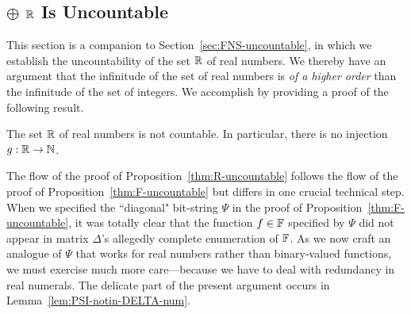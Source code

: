 \subsection{$\oplus$ $\mathbb{R}$ Is Uncountable}
\label{sec:R-uncountable}
\label{sec:Reals-uncountable}


This section is a companion to Section~\ref{sec:FNS-uncountable}, in which we establish the uncountability of the set $\mathbb{R}$ of real numbers.  We thereby have an argument that the infinitude of the set of real numbers is {\em of a higher order} than the infinitude of the set of integers.  We accomplish by providing a proof of the following result.

\begin{prop}
\label{thm:R-uncountable}
The set $\mathbb{R}$ of real numbers is not countable.  In particular, there is no injection $g: \mathbb{R} \rightarrow \mathbb{N}$.
\end{prop}

\smallskip

The flow of the proof of Proposition~\ref{thm:R-uncountable} follows the flow of the proof of Proposition~\ref{thm:F-uncountable} but differs in one crucial technical step.  When we specified the ``diagonal" bit-string $\Psi$ in the proof of Proposition~\ref{thm:F-uncountable}, it was totally clear that the function $f \in \mathbb{F}$ specified by $\Psi$ did not appear in matrix $\Delta$'s  allegedly complete enumeration of $\mathbb{F}$.  As we now craft an analogue of $\Psi$ that works for real numbers rather than binary-valued functions, we must exercise much more care---because we have to deal with redundancy in real numerals.  The delicate part of the present argument occurs in Lemma~\ref{lem:PSI-notin-DELTA-num}.

\smallskip

